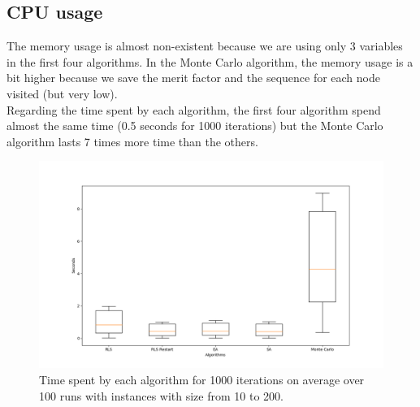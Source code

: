 \documentclass[a4paper,11pt,openany]{article}
\begin{document}
\subsection{CPU usage}
The memory usage is almost non-existent because we are using only 3 variables in the first four algorithms. In the Monte Carlo algorithm, the memory usage is a bit higher because we save the merit factor and the sequence for each node visited (but very low).\\
Regarding the time spent by each algorithm, the first four algorithm spend almost the same time (0.5 seconds for 1000 iterations) but the Monte Carlo algorithm lasts 7 times more time than the others.
\begin{figure}[H]
\begin{center}
\includegraphics[scale=0.26]{Images/time_spent}
\caption{Time spent by each algorithm for 1000 iterations on average over 100 runs with instances with size from 10 to 200.}
\label{fig:time_spent}
\end{center}
\end{figure}
\end{document}
